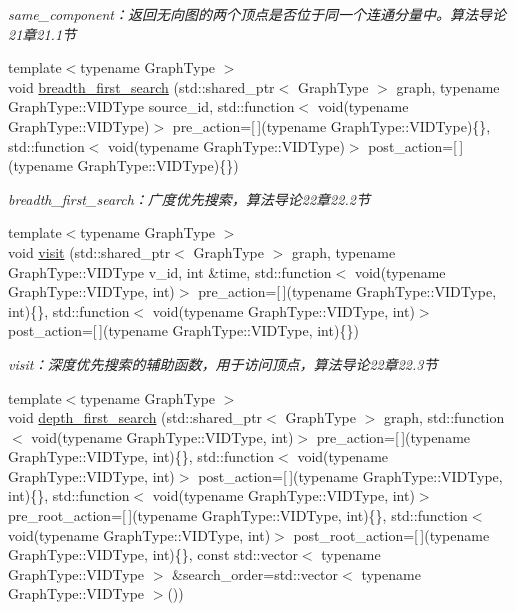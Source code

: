 \begin{DoxyCompactItemize}
\begin{DoxyCompactList}\small\item\em same\+\_\+component：返回无向图的两个顶点是否位于同一个连通分量中。算法导论21章21.1节 \end{DoxyCompactList}\item 
{\footnotesize template$<$typename Graph\+Type $>$ }\\void \hyperlink{namespace_introduction_to_algorithm_1_1_graph_algorithm_a8839165b9e3d4c8c2ccac4cdc28aadd5}{breadth\+\_\+first\+\_\+search} (std\+::shared\+\_\+ptr$<$ Graph\+Type $>$ graph, typename Graph\+Type\+::\+V\+I\+D\+Type source\+\_\+id, std\+::function$<$ void(typename Graph\+Type\+::\+V\+I\+D\+Type)$>$ pre\+\_\+action=\mbox{[}$\,$\mbox{]}(typename Graph\+Type\+::\+V\+I\+D\+Type)\{\}, std\+::function$<$ void(typename Graph\+Type\+::\+V\+I\+D\+Type)$>$ post\+\_\+action=\mbox{[}$\,$\mbox{]}(typename Graph\+Type\+::\+V\+I\+D\+Type)\{\})
\begin{DoxyCompactList}\small\item\em breadth\+\_\+first\+\_\+search：广度优先搜索，算法导论22章22.2节 \end{DoxyCompactList}\item 
{\footnotesize template$<$typename Graph\+Type $>$ }\\void \hyperlink{namespace_introduction_to_algorithm_1_1_graph_algorithm_a5fbba98b1c6a8b55f026158acc815768}{visit} (std\+::shared\+\_\+ptr$<$ Graph\+Type $>$ graph, typename Graph\+Type\+::\+V\+I\+D\+Type v\+\_\+id, int \&time, std\+::function$<$ void(typename Graph\+Type\+::\+V\+I\+D\+Type, int)$>$ pre\+\_\+action=\mbox{[}$\,$\mbox{]}(typename Graph\+Type\+::\+V\+I\+D\+Type, int)\{\}, std\+::function$<$ void(typename Graph\+Type\+::\+V\+I\+D\+Type, int)$>$ post\+\_\+action=\mbox{[}$\,$\mbox{]}(typename Graph\+Type\+::\+V\+I\+D\+Type, int)\{\})
\begin{DoxyCompactList}\small\item\em visit：深度优先搜索的辅助函数，用于访问顶点，算法导论22章22.3节 \end{DoxyCompactList}\item 
{\footnotesize template$<$typename Graph\+Type $>$ }\\void \hyperlink{namespace_introduction_to_algorithm_1_1_graph_algorithm_a9f44099f26242f50087b3cc16dff965f}{depth\+\_\+first\+\_\+search} (std\+::shared\+\_\+ptr$<$ Graph\+Type $>$ graph, std\+::function$<$ void(typename Graph\+Type\+::\+V\+I\+D\+Type, int)$>$ pre\+\_\+action=\mbox{[}$\,$\mbox{]}(typename Graph\+Type\+::\+V\+I\+D\+Type, int)\{\}, std\+::function$<$ void(typename Graph\+Type\+::\+V\+I\+D\+Type, int)$>$ post\+\_\+action=\mbox{[}$\,$\mbox{]}(typename Graph\+Type\+::\+V\+I\+D\+Type, int)\{\}, std\+::function$<$ void(typename Graph\+Type\+::\+V\+I\+D\+Type, int)$>$ pre\+\_\+root\+\_\+action=\mbox{[}$\,$\mbox{]}(typename Graph\+Type\+::\+V\+I\+D\+Type, int)\{\}, std\+::function$<$ void(typename Graph\+Type\+::\+V\+I\+D\+Type, int)$>$ post\+\_\+root\+\_\+action=\mbox{[}$\,$\mbox{]}(typename Graph\+Type\+::\+V\+I\+D\+Type, int)\{\}, const std\+::vector$<$ typename Graph\+Type\+::\+V\+I\+D\+Type $>$ \&search\+\_\+order=std\+::vector$<$ typename Graph\+Type\+::\+V\+I\+D\+Type $>$())

\end{DoxyCompactItemize}
